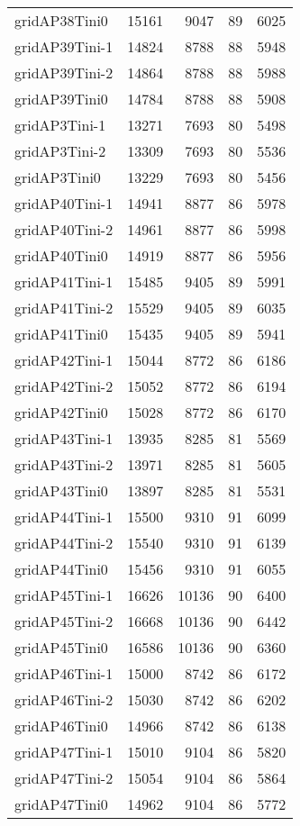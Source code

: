 \begin{longtable}{lrrrr}
gridAP38Tini0 & 15161 & 9047 & 89 & 6025 \\
gridAP39Tini-1 & 14824 & 8788 & 88 & 5948 \\
gridAP39Tini-2 & 14864 & 8788 & 88 & 5988 \\
gridAP39Tini0 & 14784 & 8788 & 88 & 5908 \\
gridAP3Tini-1 & 13271 & 7693 & 80 & 5498 \\
gridAP3Tini-2 & 13309 & 7693 & 80 & 5536 \\
gridAP3Tini0 & 13229 & 7693 & 80 & 5456 \\
gridAP40Tini-1 & 14941 & 8877 & 86 & 5978 \\
gridAP40Tini-2 & 14961 & 8877 & 86 & 5998 \\
gridAP40Tini0 & 14919 & 8877 & 86 & 5956 \\
gridAP41Tini-1 & 15485 & 9405 & 89 & 5991 \\
gridAP41Tini-2 & 15529 & 9405 & 89 & 6035 \\
gridAP41Tini0 & 15435 & 9405 & 89 & 5941 \\
gridAP42Tini-1 & 15044 & 8772 & 86 & 6186 \\
gridAP42Tini-2 & 15052 & 8772 & 86 & 6194 \\
gridAP42Tini0 & 15028 & 8772 & 86 & 6170 \\
gridAP43Tini-1 & 13935 & 8285 & 81 & 5569 \\
gridAP43Tini-2 & 13971 & 8285 & 81 & 5605 \\
gridAP43Tini0 & 13897 & 8285 & 81 & 5531 \\
gridAP44Tini-1 & 15500 & 9310 & 91 & 6099 \\
gridAP44Tini-2 & 15540 & 9310 & 91 & 6139 \\
gridAP44Tini0 & 15456 & 9310 & 91 & 6055 \\
gridAP45Tini-1 & 16626 & 10136 & 90 & 6400 \\
gridAP45Tini-2 & 16668 & 10136 & 90 & 6442 \\
gridAP45Tini0 & 16586 & 10136 & 90 & 6360 \\
gridAP46Tini-1 & 15000 & 8742 & 86 & 6172 \\
gridAP46Tini-2 & 15030 & 8742 & 86 & 6202 \\
gridAP46Tini0 & 14966 & 8742 & 86 & 6138 \\
gridAP47Tini-1 & 15010 & 9104 & 86 & 5820 \\
gridAP47Tini-2 & 15054 & 9104 & 86 & 5864 \\
gridAP47Tini0 & 14962 & 9104 & 86 & 5772 \\

\end{longtable}
